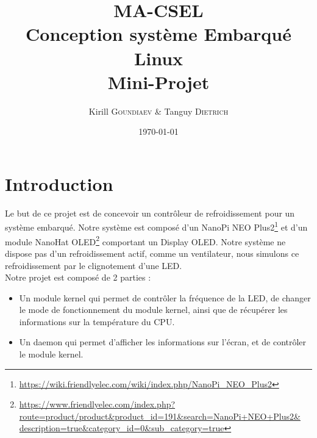 \documentclass[
	a4paper, %
	10pt, %
]{CSUniSchoolLabReport}
\title{MA-CSEL \\ Conception système Embarqué Linux \\ Mini-Projet } %
\author{Kirill \textsc{Goundiaev} \& Tanguy \textsc{Dietrich}} %
\date{\today} %
\begin{document}
\maketitle %

\begin{figure}[H] %
\label{fig:speciation}
\end{figure}


\newpage

\tableofcontents
\newpage

\section{Introduction}\label{Introduction}
Le but de ce projet est de concevoir un contrôleur de refroidissement pour un système embarqué. Notre système est composé d'un NanoPi NEO Plus2\footnote{\href{https://wiki.friendlyelec.com/wiki/index.php/NanoPi_NEO_Plus2}{https://wiki.friendlyelec.com/wiki/index.php/NanoPi\_NEO\_Plus2}} et d'un module NanoHat OLED\footnote{\href{https://www.friendlyelec.com/index.php?route=product/product&product_id=191&search=NanoPi+NEO+Plus2&description=true&category_id=0&sub_category=true}{https://www.friendlyelec.com/index.php?route=product/product\&product\_id=191\&search=NanoPi+NEO+Plus2\&\\description=true\&category\_id=0\&sub\_category=true}} comportant un Display OLED. Notre système ne dispose pas d'un refroidissement actif, comme un ventilateur, nous simulons ce refroidissement par le clignotement d'une LED.\\

Notre projet est composé de 2 parties : \\
\begin{itemize}
	\item Un module kernel qui permet de contrôler la fréquence de la LED, de changer le mode de fonctionnement du module kernel, ainsi que de récupérer les informations sur la température du CPU.
	\item Un daemon qui permet d'afficher les informations sur l'écran, et de contrôler le module kernel.
\end{itemize}
\end{document}
